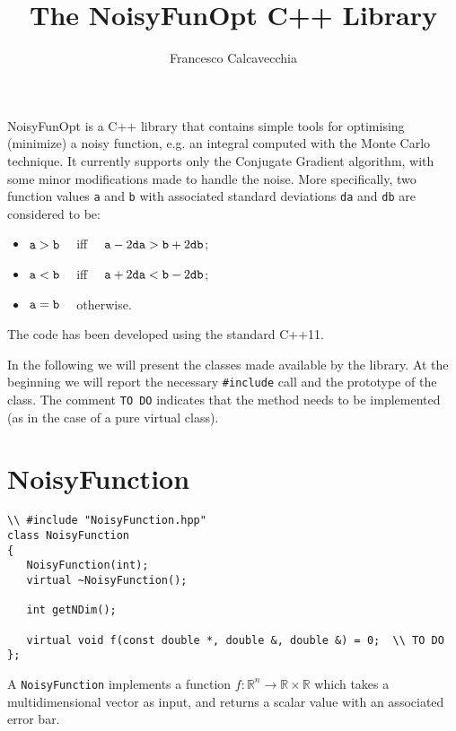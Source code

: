 \documentclass[11pt,a4paper,twoside]{article}
\title{The NoisyFunOpt C++ Library}
\author{Francesco Calcavecchia}
\begin{document}
\maketitle

NoisyFunOpt is a C++ library that contains simple tools for optimising (minimize) a noisy function, e.g. an integral computed with the Monte Carlo technique.
It currently supports only the Conjugate Gradient algorithm, with some minor modifications made to handle the noise.
More specifically, two function values \verb+a+ and \verb+b+ with associated standard deviations \verb+da+ and \verb+db+ are considered to be:
\begin{itemize}
   \item $\verb+a+ > \verb+b+ \quad $ iff $ \quad \verb+a+ - 2 \verb+da+ > \verb+b+ + 2 \verb+db+$;
   \item $\verb+a+ < \verb+b+ \quad $ iff $ \quad \verb+a+ + 2 \verb+da+ < \verb+b+ - 2 \verb+db+$;
   \item $\verb+a+ = \verb+b+ \quad $ otherwise.
\end{itemize}

The code has been developed using the standard C++11.

In the following we will present the classes made available by the library.
At the beginning we will report the necessary \verb+#include+ call and the prototype of the class.
The comment \verb+TO DO+ indicates that the method needs to be implemented (as in the case of a pure virtual class).


\section{NoisyFunction}
\label{sec:NoisyFunction}

\begin{verbatim}
\\ #include "NoisyFunction.hpp"
class NoisyFunction
{
   NoisyFunction(int);
   virtual ~NoisyFunction();
   
   int getNDim();
   
   virtual void f(const double *, double &, double &) = 0;  \\ TO DO
};
\end{verbatim}

A \verb+NoisyFunction+ implements a function $f:\mathbb{R}^{n} \rightarrow \mathbb{R} \times \mathbb{R}$ which takes a multidimensional vector as input, and returns a scalar value with an associated error bar. 
\end{document}
